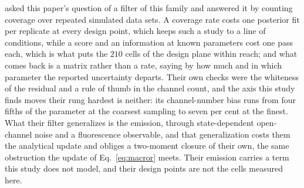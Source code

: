 \begin{appendixbox}
\citet{munch2022bayesian} asked this paper's question of a filter of this family and answered it by counting coverage over repeated simulated data sets. A coverage rate costs one posterior fit per replicate at every design point, which keeps such a study to a line of conditions, while a score and an information at known parameters cost one pass each, which is what puts the $210$ cells of the design plane within reach; and what comes back is a matrix rather than a rate, saying by how much and in which parameter the reported uncertainty departs. Their own checks were the whiteness of the residual and a rule of thumb in the channel count, and the axis this study finds moves their rung hardest is neither: its channel-number bias runs from four fifths of the parameter at the coarsest sampling to seven per cent at the finest. What their filter generalizes is the emission, through state-dependent open-channel noise and a fluorescence observable, and that generalization costs them the analytical update and obliges a two-moment closure of their own, the same obstruction the update of Eq.~\ref{eq:macror} meets. Their emission carries a term this study does not model, and their design points are not the cells measured here.


\end{appendixbox}
